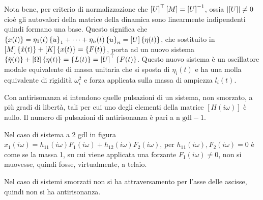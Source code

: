 Nota bene, per criterio di normalizzazione che \(\left[ U \right]^\top \left[M\right] = \left[ U \right]^{-1}\), ossia \(\left|\left[ U \right]\right| \neq 0\) cioè gli autovalori della matrice della dinamica sono linearmente indipendenti quindi formano una base.
Questo significa che \(\left\{ x(t) \right\} = \eta_1(t) \left\{ u \right\}_1 + \dots + \eta_n(t) \left\{ u \right\}_n = \left[ U \right] \left\{ \eta(t) \right\}\), che sostituito in \(\left[M\right] \left\{ \Ddot{x}(t) \right\} + \left[ K \right] \left\{ x(t) \right\} = \left\{ F(t) \right\}\), porta ad un nuovo sistema \(\left\{ \Ddot{\eta}(t) \right\} + \left[ \Omega \right] \left\{ \eta(t) \right\} = \left\{ L(t) \right\} = \left[ U \right]^\top \left\{ F(t) \right\} \).
Questo nuovo sistema è un oscillatore modale equivalente di massa unitaria che si sposta di \(\eta_i(t)\) e ha una molla equivalente di rigidità \(\omega_i^2\) e forza applicata sulla massa di ampiezza \(l_i(t)\).


Con antirisonanza si intendono quelle pulsazioni di un sistema, non smorzato, a più gradi di libertà, tali per cui uno degli elementi della matrice \(\left[ H(i\omega) \right]\) è nullo.
Il numero di pulsazioni di antirisonanza è pari a \(\text{n gdl} - 1\).

Nel caso di sistema a 2 gdl in figura  \( x_1(i\omega) = h_{11}(i\omega) F_1(i\omega) + h_{12}(i\omega)F_2(i\omega) \), per \( h_{11}(i\omega), F_2(i\omega) = 0\) è come se la massa 1, su cui viene applicata una forzante \(F_1(i\omega)\neq 0\), non si muovesse, quindi fosse, virtualmente, a telaio.

Nel caso di sistemi smorzati non si ha attraversamento per l'asse delle ascisse, quindi non si ha antirisonanza.

